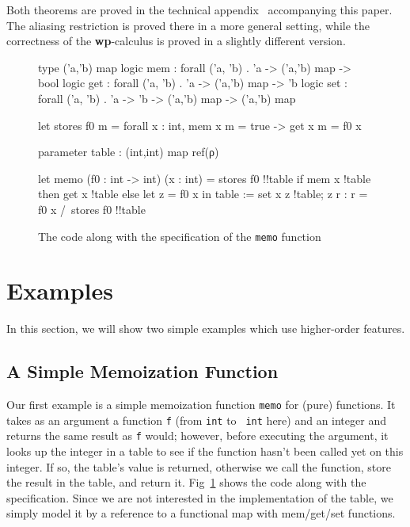 \documentclass[a4paper]{llncs}
\newcommand{\wpre}{{\bf wp}}
\begin{document}
Both theorems are proved in the technical appendix~\cite{appendixesop2010}
accompanying this paper. The aliasing restriction is proved there in a more
general setting, while the correctness of the \wpre-calculus is proved in a
slightly different version.

\begin{figure}[tpb]
\begin{who}
type ('a,'b) map
logic mem : forall ('a, 'b) . 'a -> ('a,'b) map -> bool
logic get : forall ('a, 'b) . 'a -> ('a,'b) map -> 'b
logic set : forall ('a, 'b) . 'a -> 'b -> ('a,'b) map -> ('a,'b) map

let stores f0 m =
  forall x : int, mem x m = true -> get x m = f0 x

parameter table : (int,int) map ref(ρ)

let memo (f0 : int -> int) (x : int) = 
  {stores f0 !!table}
  if mem x !table then get x !table
  else
    let z = f0 x in
    table := set x z !table;
    z
  {r : r = f0 x /\ stores f0 !!table}
\end{who}
  \caption{The code along with the specification of the {\tt memo} function}
  \label{fig:memo}
\end{figure}

\section{Examples}
\label{sec:examples}

In this section, we will show two simple examples which use higher-order
features.

\subsection{A Simple Memoization Function}

Our first example is a simple memoization function {\tt memo} for (pure)
functions.  It takes as an argument a function {\tt f} (from {\tt int} to {\tt
int} here) and an integer and returns the same result as {\tt f} would;
however, before executing the argument, it looks up the integer in a table to
see if the function hasn't been called yet on this integer. If so, the table's
value is returned, otherwise we call the function, store the result in the
table, and return it. Fig~\ref{fig:memo} shows the code along with the
specification. Since we are not interested in the implementation of the table,
we simply model it by a reference to a functional map with mem/get/set functions.
\end{document}
